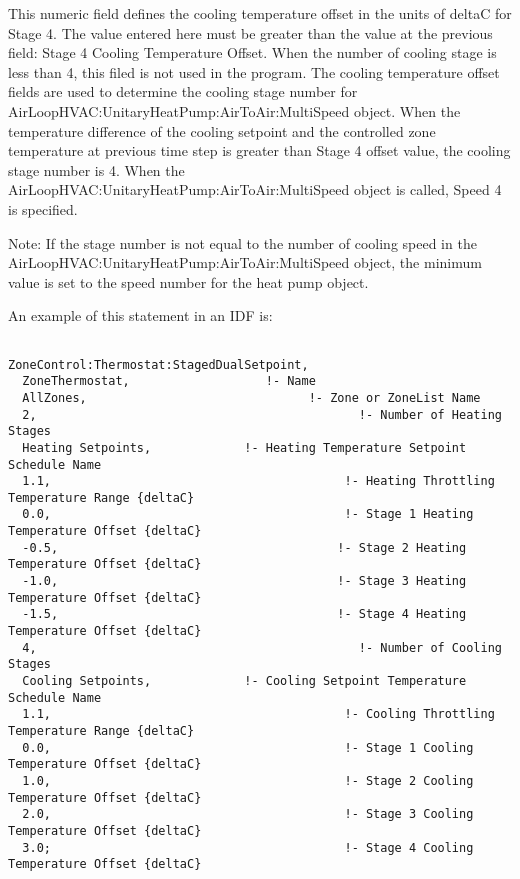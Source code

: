 This numeric field defines the cooling temperature offset in the units of deltaC for Stage 4. The value entered here must be greater than the value at the previous field: Stage 4 Cooling Temperature Offset. When the number of cooling stage is less than 4, this filed is not used in the program. The cooling temperature offset fields are used to determine the cooling stage number for AirLoopHVAC:UnitaryHeatPump:AirToAir:MultiSpeed object. When the temperature difference of the cooling setpoint and the controlled zone temperature at previous time step is greater than Stage 4 offset value, the cooling stage number is 4. When the AirLoopHVAC:UnitaryHeatPump:AirToAir:MultiSpeed object is called, Speed 4 is specified.

Note: If the stage number is not equal to the number of cooling speed in the AirLoopHVAC:UnitaryHeatPump:AirToAir:MultiSpeed object, the minimum value is set to the speed number for the heat pump object.

An example of this statement in an IDF is:

\begin{lstlisting}

ZoneControl:Thermostat:StagedDualSetpoint,
  ZoneThermostat,                   !- Name
  AllZones,                               !- Zone or ZoneList Name
  2,                                             !- Number of Heating Stages
  Heating Setpoints,             !- Heating Temperature Setpoint Schedule Name
  1.1,                                         !- Heating Throttling Temperature Range {deltaC}
  0.0,                                         !- Stage 1 Heating Temperature Offset {deltaC}
  -0.5,                                       !- Stage 2 Heating Temperature Offset {deltaC}
  -1.0,                                       !- Stage 3 Heating Temperature Offset {deltaC}
  -1.5,                                       !- Stage 4 Heating Temperature Offset {deltaC}
  4,                                             !- Number of Cooling Stages
  Cooling Setpoints,             !- Cooling Setpoint Temperature Schedule Name
  1.1,                                         !- Cooling Throttling Temperature Range {deltaC}
  0.0,                                         !- Stage 1 Cooling Temperature Offset {deltaC}
  1.0,                                         !- Stage 2 Cooling Temperature Offset {deltaC}
  2.0,                                         !- Stage 3 Cooling Temperature Offset {deltaC}
  3.0;                                         !- Stage 4 Cooling Temperature Offset {deltaC}
\end{lstlisting}

